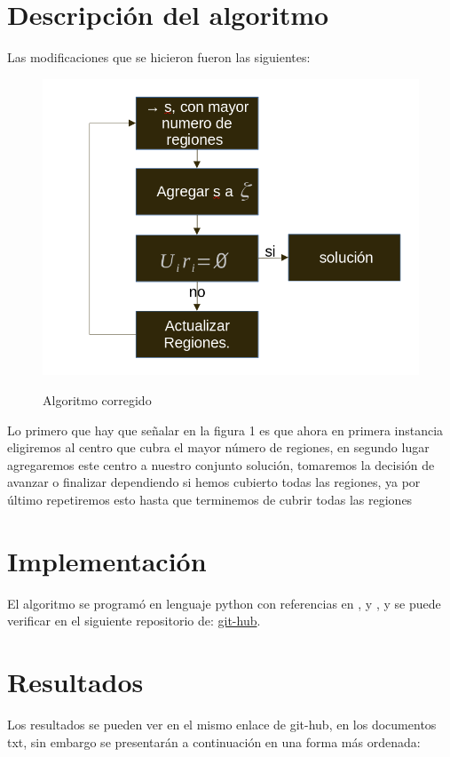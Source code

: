 \documentclass[12pt,a4paper]{article}
\begin{document}
\section{Descripción del algoritmo}
 Las modificaciones que se hicieron fueron las siguientes:
 
 \begin{figure}[hbtp]
 \centering
 \includegraphics[scale=0.3]{algoritmo set covering.png} \label{algoritmo}
 \caption{Algoritmo corregido}

 \end{figure}
 
 Lo primero que hay que señalar en la figura 1 es que ahora en primera instancia eligiremos al centro que cubra el mayor número de regiones, en segundo lugar agregaremos este centro a nuestro conjunto solución, tomaremos la decisión de avanzar o finalizar dependiendo si hemos cubierto todas las regiones, ya por último repetiremos esto hasta que terminemos de cubrir todas las regiones 
 \newpage
\section{Implementación} 
El algoritmo se programó en lenguaje python con referencias en \cite{van1991guia}, \cite{van2017tutorial} y \cite{chun2001core}, y se puede verificar en el siguiente repositorio de: \href{https://github.com/arnoldae9/PycharmProjects.git}{git-hub}.

\section{Resultados} 
Los resultados se pueden ver en el mismo enlace de git-hub, en los documentos txt, sin embargo se presentarán a continuación en una forma más ordenada:
\end{document}
